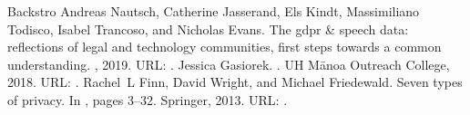 \documentclass[letterpaper,10pt,english]{jupyterBook}
\begin{document}
\begin{sphinxthebibliography}{Backstro}
\sphinxAtStartPar
Andreas Nautsch, Catherine Jasserand, Els Kindt, Massimiliano Todisco, Isabel Trancoso, and Nicholas Evans. The gdpr \& speech data: reflections of legal and technology communities, first steps towards a common understanding. , 2019. URL: .
\sphinxAtStartPar
Jessica Gasiorek. . UH Mānoa Outreach College, 2018. URL: .
\sphinxAtStartPar
Rachel L Finn, David Wright, and Michael Friedewald. Seven types of privacy. In , pages 3–32. Springer, 2013. URL: .
\end{sphinxthebibliography}







\renewcommand{\indexname}{Index}
\printindex
\end{document}
